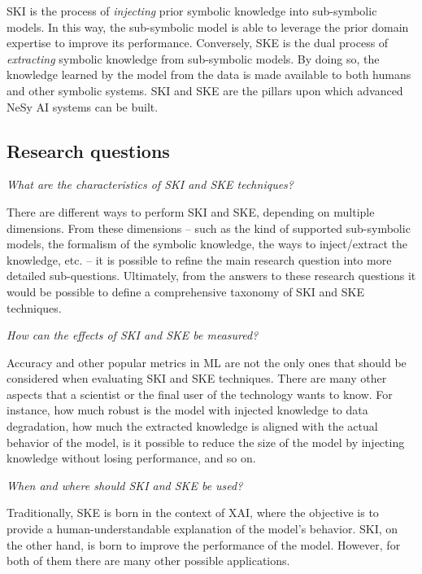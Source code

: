 \begin{refsection}
\Gls{SKI} is the process of \emph{injecting} prior symbolic knowledge into sub-symbolic models.
%
In this way, the sub-symbolic model is able to leverage the prior domain expertise to improve its performance.
%
Conversely, \gls{SKE} is the dual process of \emph{extracting} symbolic knowledge from sub-symbolic models.
%
By doing so, the knowledge learned by the model from the data is made available to both humans and other symbolic systems.
%
\Gls{SKI} and \gls{SKE} are the pillars upon which advanced \gls{NeSy} \gls{AI} systems can be built.


\subsection*{Research questions}
%
\begin{questions}
    \item \emph{What are the characteristics of \gls{SKI} and \gls{SKE} techniques?}

    There are different ways to perform \gls{SKI} and \gls{SKE}, depending on multiple dimensions.
    From these dimensions -- such as the kind of supported sub-symbolic models, the formalism of the symbolic knowledge, the ways to inject/extract the knowledge, etc. -- it is possible to refine the main research question into more detailed sub-questions.
    Ultimately, from the answers to these research questions it would be possible to define a comprehensive taxonomy of \gls{SKI} and \gls{SKE} techniques.
    \label{itm:rq1}

    \item \emph{How can the effects of \gls{SKI} and \gls{SKE} be measured?}

    Accuracy and other popular metrics in \gls{ML} are not the only ones that should be considered when evaluating \gls{SKI} and \gls{SKE} techniques.
    There are many other aspects that a scientist or the final user of the technology wants to know.
    For instance,
    how much robust is the model with injected knowledge to data degradation,
    how much the extracted knowledge is aligned with the actual behavior of the model,
    is it possible to reduce the size of the model by injecting knowledge without losing performance, and so on.
    \label{itm:rq2}

    \item \emph{When and where should \gls{SKI} and \gls{SKE} be used?}

    Traditionally, \gls{SKE} is born in the context of \gls{XAI}, where the objective is to provide a human-understandable explanation of the model's behavior.
    \Gls{SKI}, on the other hand, is born to improve the performance of the model.
    However, for both of them there are many other possible applications.
    \label{itm:rq3}


\end{questions}
\end{refsection}
